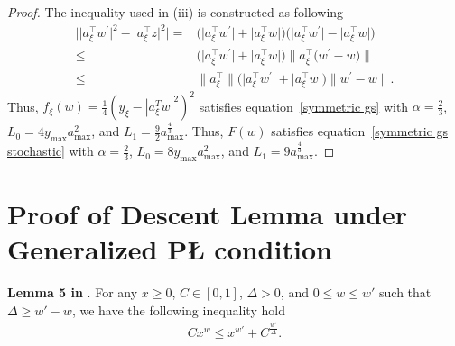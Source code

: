 \documentclass[10pt]{article} %
\def\eqref#1{equation~\ref{#1}}
\newtheorem{proof}{Proof}
\begin{document}
\begin{proof}
The inequality used in (iii) is constructed as following
\begin{align}
\big|\big|a_{\xi}^{\top} w^{\prime}\big|^2-\big|a_{\xi}^{\top} z\big|^2\big|=&\big(\big|a_{\xi}^{\top} w^{\prime}\big|+\big|a_{\xi}^{\top} w\big|\big)\big(\big|a_{\xi}^{\top} w^{\prime}\big|-\big|a_{\xi}^{\top} w\big|\big)\nonumber\\ \leq&\big(\big|a_{\xi}^{\top} w^{\prime}\big|+\big|a_{\xi}^{\top} w\big|\big)\big\|a_{\xi}^{\top}\big(w^{\prime}-w\big)\big\|\nonumber\\ \leq&\big\|a_{\xi}^{\top}\big\|\big(\big|a_{\xi}^{\top} w^{\prime}\big|+\big|a_{\xi}^{\top} w\big|\big)\big\|w^{\prime}-w\big\|.
\label{technical ineq}
\end{align}
Thus, $f_{\xi}(w)=\frac{1}{4}(y_{\xi}-|a_{\xi}^Tw|^2)^2$ satisfies \eqref{symmetric gs} with $\alpha=\frac{2}{3}$, $L_0=4y_{\max}a_{\max}^2$, and $L_1=\frac{9}{2}a^{\frac{4}{3}}_{\max}$. Thus, $F(w)$ satisfies \eqref{symmetric gs stochastic} with $\alpha=\frac{2}{3}$, $L_0=8y_{\max}a_{\max}^2$, and $L_1={9}a^{\frac{4}{3}}_{\max}$.

\end{proof}





\section{Proof of Descent Lemma under Generalized P{\L} condition}\label{Appendix D}
\textbf{Lemma 5 in} \citet{pmlr-v202-chen23ar}.\label{technical lemma}
    For any $x\geq 0$, $C\in [0,1]$, $\Delta>0$, and $0\leq w\leq w'$ such that $\Delta\geq w'-w$, we have the following inequality hold
    \begin{align}
        Cx^{w}\leq x^{w'}+C^{\frac{w'}{\Delta}}.
        \label{Technical Lemma's inequality}
    \end{align}
    
\end{document}
